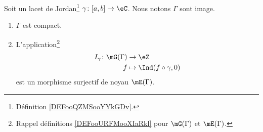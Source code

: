 \begin{lemma}     \label{LEMooBZUCooHWfolf}
    Soit un lacet de Jordan\footnote{Définition \ref{DEFooQZMSooYYkGDv}.} \( \gamma\colon \mathopen[ a , b \mathclose]\to \eC\). Nous notons \( \Gamma\) sont image. 
    \begin{enumerate}
        \item
            \( \Gamma\) est compact.
        \item
            L'application\footnote{Rappel définitions \ref{DEFooURFMooXIaRkl} pour \( \mG(\Gamma)\) et \( \mE(\Gamma)\).}
            \begin{equation}
                \begin{aligned}
                    I_{\gamma}\colon \mG(\Gamma)&\to \eZ \\
                    f&\mapsto \Ind(f\circ \gamma, 0) 
                \end{aligned}
            \end{equation}
            est un morphisme surjectif de noyau \( \mE(\Gamma)\).
    \end{enumerate}
\end{lemma}

